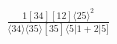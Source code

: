 \documentclass[varwidth, border=5pt]{standalone}
\begin{document}
\begin{my}
$\begin{gathered}
\scriptscriptstyle\frac{1[34][12]⟨25⟩^2}{⟨34⟩⟨35⟩[35]⟨5|1+2|5]}
\end{gathered}$
\end{my}
\end{document}
